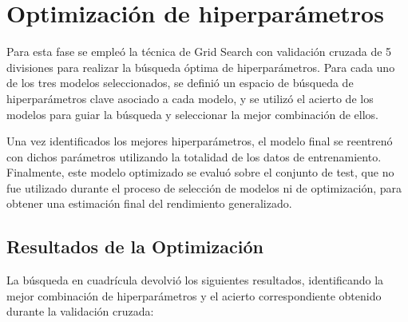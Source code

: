\documentclass[a4paper,12pt]{article}
\begin{document}
\newpage
\section{Optimización de hiperparámetros}

Para esta fase se empleó la técnica de Grid Search con validación cruzada de 5 divisiones para realizar la búsqueda óptima de hiperparámetros. Para cada uno de los tres modelos seleccionados, se definió un espacio de búsqueda de hiperparámetros clave asociado a cada modelo, y se utilizó el acierto de los modelos para guiar la búsqueda y seleccionar la mejor combinación de ellos.

Una vez identificados los mejores hiperparámetros, el modelo final se reentrenó con dichos parámetros utilizando la totalidad de los datos de entrenamiento. Finalmente, este modelo optimizado se evaluó sobre el conjunto de test, que no fue utilizado durante el proceso de selección de modelos ni de optimización, para obtener una estimación final del rendimiento generalizado.

\subsection{Resultados de la Optimización}

La búsqueda en cuadrícula devolvió los siguientes resultados, identificando la mejor combinación de hiperparámetros y el acierto correspondiente obtenido durante la validación cruzada:
\end{document}
